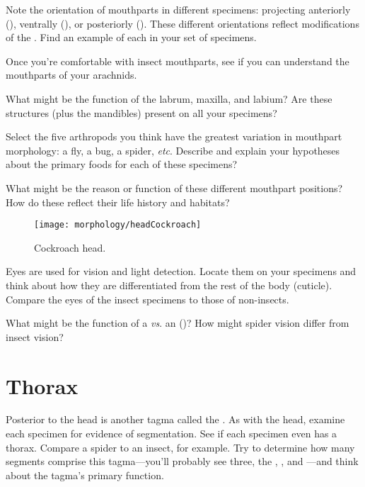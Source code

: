 \noindent{}Note the orientation of mouthparts in different specimens: projecting anteriorly\\ (), ventrally (), or posteriorly (). These different orientations reflect modifications of the . Find an example of each in your set of specimens.\vspace{3mm}

\noindent{}Once you're comfortable with insect mouthparts, see if you can understand the mouthparts of your arachnids.\vspace{3mm}

\begin{theo}[traits5]
{}What might be the function of the labrum, maxilla, and labium? Are these structures (plus the mandibles) present on all your specimens?\vspace{3mm}

\noindent{}Select the five arthropods you think have the greatest variation in mouthpart morphology: a fly, a bug, a spider, \textit{etc}. Describe and explain your hypotheses about the primary foods for each of these specimens? \vspace{3mm}

\noindent{}What might be the reason or function of these different mouthpart positions? How do these reflect their life history and habitats?
\end{theo}

\begin{figure}[ht!]
  \centering
    \texttt{[image: morphology/headCockroach]}
  \caption{Cockroach head. \citep[][Fig. 2A--E]{snodgrass1944feeding}}
  \label{fig:headCockroach}
\end{figure}

\noindent{}Eyes are used for vision and light detection. Locate them on your specimens and think about how they are differentiated from the rest of the body (cuticle). Compare the eyes of the insect specimens to those of non-insects.\vspace{3mm}

\begin{theo}[traits6]
{}What might be the function of a  \textit{vs}. an  ()? How might spider vision differ from insect vision?
\end{theo}

\section{Thorax}
Posterior to the head is another tagma called the . As with the head, examine each specimen for evidence of segmentation. See if each specimen even has a thorax. Compare a spider to an insect, for example. Try to determine how many segments comprise this tagma---you'll probably see three, the , , and ---and think about the tagma's primary function.\vspace{3mm}

